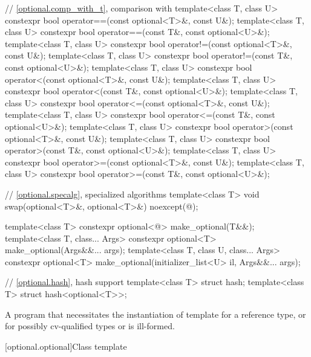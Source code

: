 \begin{codeblock}
{  // \ref{optional.comp_with_t}, comparison with 
  template<class T, class U> constexpr bool operator==(const optional<T>&, const U&);
  template<class T, class U> constexpr bool operator==(const T&, const optional<U>&);
  template<class T, class U> constexpr bool operator!=(const optional<T>&, const U&);
  template<class T, class U> constexpr bool operator!=(const T&, const optional<U>&);
  template<class T, class U> constexpr bool operator<(const optional<T>&, const U&);
  template<class T, class U> constexpr bool operator<(const T&, const optional<U>&);
  template<class T, class U> constexpr bool operator<=(const optional<T>&, const U&);
  template<class T, class U> constexpr bool operator<=(const T&, const optional<U>&);
  template<class T, class U> constexpr bool operator>(const optional<T>&, const U&);
  template<class T, class U> constexpr bool operator>(const T&, const optional<U>&);
  template<class T, class U> constexpr bool operator>=(const optional<T>&, const U&);
  template<class T, class U> constexpr bool operator>=(const T&, const optional<U>&);

  // \ref{optional.specalg}, specialized algorithms
  template<class T>
    void swap(optional<T>&, optional<T>&) noexcept(@\seebelow@);

  template<class T>
    constexpr optional<@\seebelow@> make_optional(T&&);
  template<class T, class... Args>
    constexpr optional<T> make_optional(Args&&... args);
  template<class T, class U, class... Args>
    constexpr optional<T> make_optional(initializer_list<U> il, Args&&... args);

  // \ref{optional.hash}, hash support
  template<class T> struct hash;
  template<class T> struct hash<optional<T>>;
}
\end{codeblock}

\pnum
A program that necessitates the instantiation of template  for
a reference type, or for possibly cv-qualified types  or
 is ill-formed.

[optional.optional]{Class template }

